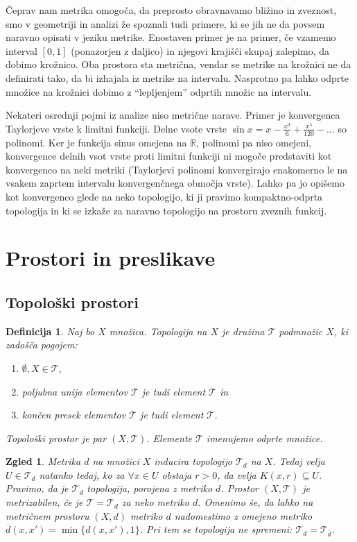 \documentclass[10pt, a4paper]{article}
\newtheorem{defi}{Definicija}[section]
\newenvironment{noticeB}{%
  \tcolorbox[%
  notitle,
  empty,
  enhanced,  %
  breakable,
  coltext=black,
  colback=white, 
  fontupper=\rmfamily,
  parbox=false,
  noparskip,
  sharp corners,
  boxrule=-1pt,  %
  frame hidden,
  left=7pt,  %
  right=7pt,
  top=5pt,
  bottom=5pt,
  before skip=2.5ex plus 2pt,
  after skip=2.5ex plus 2pt,
  borderline west = {1.5pt}{-0.1pt}{blue!30!black}, %
  overlay unbroken and last={%
    \draw[color=black, line width=1.25pt]
    ($(frame.south west)+(1.pt, -0.1pt)$) -- ++(2em, 0);
  }
  ]}
{\endtcolorbox}
\newenvironment{definicija}{\begin{noticeB}\begin{defi}}{%
    \end{defi}\end{noticeB}}
\newtheorem{zgled}{Zgled}[section]
\newcommand{\R}{\mathbb {R}}
\begin{document}
Čeprav nam metrika omogoča, da preprosto obravnavamo bližino in zveznost, smo v geometriji in analizi 
že spoznali tudi primere, ki se jih ne da povsem naravno opisati v jeziku metrike.
Enostaven primer je na primer, če vzamemo interval $[0, 1]$ (ponazorjen z daljico)
in njegovi krajišči skupaj zalepimo, da dobimo krožnico.
Oba prostora sta metrična, vendar se metrike na krožnici ne da definirati tako, da bi izhajala iz metrike na intervalu.
Nasprotno pa lahko odprte množice na krožnici dobimo z "`lepljenjem"' odprtih množic na intervalu.

Nekateri osrednji pojmi iz analize niso metrične narave. Primer je konvergenca Taylorjeve vrste k limitni funkciji.
Delne vsote vrste $\sin x = x - \frac{x^3}{6} + \frac{x^5}{120} - \dots$ so polinomi.
Ker je funkcija sinus omejena na $\R$, polinomi pa niso omejeni, konvergence delnih vsot vrste proti limitni funkciji ni mogoče predstaviti
kot konvergenco na neki metriki (Taylorjevi polinomi konvergirajo enakomerno le na vsakem zaprtem intervalu konvergenčnega območja vrste).
Lahko pa jo opišemo kot konvergenco glede na neko topologijo, ki ji pravimo kompaktno-odprta topologija 
in ki se izkaže za naravno topologijo na prostoru zveznih funkcij.

\section{Prostori in preslikave}

\subsection{Topološki prostori}

\begin{definicija}
  Naj bo $X$ množica. Topologija na $X$ je družina $\mathcal{T}$ podmnožic $X$,
  ki zadošča pogojem:
  \begin{enumerate}
    \item $\emptyset, X \in \mathcal{T}$,
    \item poljubna unija elementov $\mathcal{T}$ je tudi element $\mathcal{T}$ in 
    \item končen presek elementov $\mathcal{T}$ je tudi element $\mathcal{T}$.
  \end{enumerate}
  Topološki prostor je par $(X, \mathcal{T})$. Elemente $\mathcal{T}$ imenujemo odprte množice. 
\end{definicija}

\begin{zgled}
    Metrika $d$ na množici $X$ inducira topologijo $\mathcal{T}_d$ na $X$.
    Tedaj velja $U \in \mathcal{T}_d$ natanko tedaj, ko za $\forall x \in U$
    obstaja $r > 0$, da velja $K(x, r) \subseteq U$.
    Pravimo, da je $\mathcal{T}_d$ topologija, porojena z metriko $d$.
    Prostor $(X, \mathcal{T})$ je metrizabilen, če je $\mathcal{T} = \mathcal{T}_d$ za neko metriko $d$.
    Omenimo še, da lahko na metričnem prostoru $(X, d)$ metriko $d$ nadomestimo z omejeno metriko
    $\overline{d} (x, x') = \min \{d(x, x'), 1\}$. Pri tem se topologija ne spremeni: $\mathcal{T}_d = \mathcal{T}_{\overline{d}}$.
\end{zgled}
\end{document}
